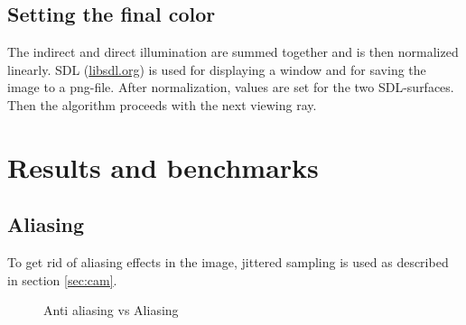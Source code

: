 \documentclass[a4paper]{report}
\begin{document}
\section{Setting the final color}

The indirect and direct illumination are summed together and is
then normalized linearly. SDL (\url{libsdl.org}) is used for
displaying a window and for saving the image to a png-file. After
normalization, values are set for the two SDL-surfaces. Then the
algorithm proceeds with the next viewing ray.

\chapter{Results and benchmarks}
\label{ch:results}

\section{Aliasing}

To get rid of aliasing effects in the image, jittered sampling is used
as described in section \ref{sec:cam}.

\begin{figure}
  \centering
  \caption{Anti aliasing vs Aliasing}
  \label{fig:aliasingcomp}
\end{figure}
\end{document}
